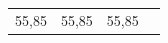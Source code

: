 {\begin{tabular}[t]{|l|l|l|l|}
    
        55,85 &
    
    
        55,85 &
    
    
        55,85%
     \tabularnewline\cline{1-1}\cline{2-2}\cline{3-3}\cline{4-4}
    \end{tabular}} %
      \addtocounter{footnote}{-0}
      
    
